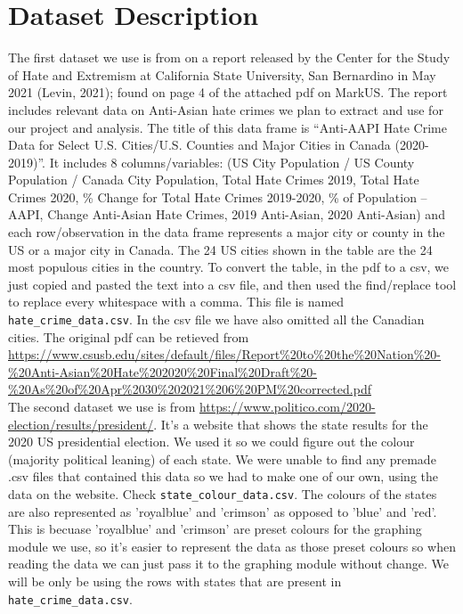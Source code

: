 \documentclass[fontsize=11pt]{article}
\begin{document}
\section*{Dataset Description}

    \quad The first dataset we use is from on a report released by the Center for the Study of Hate and Extremism at California State University, San Bernardino in May 2021 (Levin, 2021); found on page 4 of the attached pdf on MarkUS. The report includes relevant data on Anti-Asian hate crimes we plan to extract and use for our project and analysis. The title of this data frame is “Anti-AAPI Hate Crime Data for Select U.S. Cities/U.S. Counties and Major Cities in Canada (2020-2019)”. It includes 8 columns/variables: (US City Population / US County Population / Canada City Population, Total Hate Crimes 2019, Total Hate Crimes 2020, \% Change for Total Hate Crimes 2019-2020, \% of Population – AAPI, Change Anti-Asian Hate Crimes, 2019 Anti-Asian, 2020 Anti-Asian) and each row/observation in the data frame represents a major city or county in the US or a major city in Canada. The 24 US cities shown in the table are the 24 most populous cities in the country. To convert the table, in the pdf to a csv, we just copied and pasted the text into a csv file, and then used the find/replace tool to replace every whitespace with a comma. This file is named \texttt{hate\_crime\_data.csv}. In the csv file we have also omitted all the Canadian cities. The original pdf can be retieved from \url{https://www.csusb.edu/sites/default/files/Report%20to%20the%20Nation%20-%20Anti-Asian%20Hate%202020%20Final%20Draft%20-%20As%20of%20Apr%2030%202021%206%20PM%20corrected.pdf}
    \\

    The second dataset we use is from \url{https://www.politico.com/2020-election/results/president/}. It's a website that shows the state results for the 2020 US presidential election. We used it so we could figure out the colour (majority political leaning) of each state. We were unable to find any premade .csv files that contained this data so we had to make one of our own, using the data on the website. Check \texttt{state\_colour\_data.csv}. The colours of the states are also represented as 'royalblue' and 'crimson' as opposed to 'blue' and 'red'. This is becuase 'royalblue' and 'crimson' are preset colours for the graphing module we use, so it's easier to represent the data as those preset colours so when reading the data we can just pass it to the graphing module without change. We will be only be using the rows with states that are present in \texttt{hate\_crime\_data.csv}. \\
\end{document}
